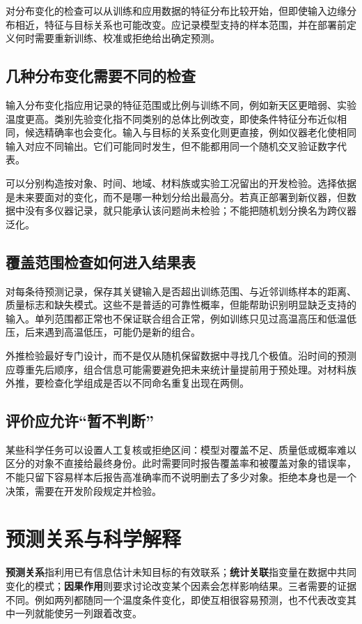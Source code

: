 对分布变化的检查可以从训练和应用数据的特征分布比较开始，但即使输入边缘分布相近，特征与目标关系也可能改变。应记录模型支持的样本范围，并在部署前定义何时需要重新训练、校准或拒绝给出确定预测。

\subsection{几种分布变化需要不同的检查}
输入分布变化指应用记录的特征范围或比例与训练不同，例如新天区更暗弱、实验温度更高。类别先验变化指不同类别的总体比例改变，即使条件特征分布近似相同，候选精确率也会变化。输入与目标的关系变化则更直接，例如仪器老化使相同输入对应不同输出。它们可能同时发生，但不能都用同一个随机交叉验证数字代表。

可以分别构造按对象、时间、地域、材料族或实验工况留出的开发检验。选择依据是未来要面对的变化，而不是哪一种划分给出最高分。若真正部署到新仪器，但数据中没有多仪器记录，就只能承认该问题尚未检验；不能把随机划分换名为跨仪器泛化。

\subsection{覆盖范围检查如何进入结果表}
对每条待预测记录，保存其关键输入是否超出训练范围、与近邻训练样本的距离、质量标志和缺失模式。这些不是普适的可靠性概率，但能帮助识别明显缺乏支持的输入。单列范围都正常也不保证联合组合正常，例如训练只见过高温高压和低温低压，后来遇到高温低压，可能仍是新的组合。

外推检验最好专门设计，而不是仅从随机保留数据中寻找几个极值。沿时间的预测应尊重先后顺序，组合信息可能需要避免把未来统计量提前用于预处理。对材料族外推，要检查化学组成是否以不同命名重复出现在两侧。

\subsection{评价应允许“暂不判断”}
某些科学任务可以设置人工复核或拒绝区间：模型对覆盖不足、质量低或概率难以区分的对象不直接给最终身份。此时需要同时报告覆盖率和被覆盖对象的错误率，不能只留下容易样本后报告高准确率而不说明删去了多少对象。拒绝本身也是一个决策，需要在开发阶段规定并检验。

\section{预测关系与科学解释}

\textbf{预测关系}指利用已有信息估计未知目标的有效联系；\textbf{统计关联}指变量在数据中共同变化的模式；\textbf{因果作用}则要求讨论改变某个因素会怎样影响结果。三者需要的证据不同。例如两列都随同一个温度条件变化，即使互相很容易预测，也不代表改变其中一列就能使另一列跟着改变。

